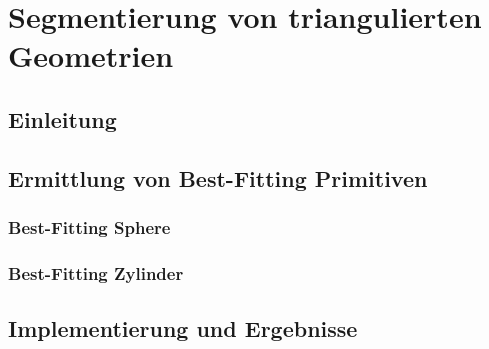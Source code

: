 \chapter{Segmentierung von triangulierten Geometrien}
\label{cha:segment}
	
\section{Einleitung}


\section{Ermittlung von Best-Fitting Primitiven}

\subsection{Best-Fitting Sphere}

\subsection{Best-Fitting Zylinder}


\section{Implementierung und Ergebnisse}
